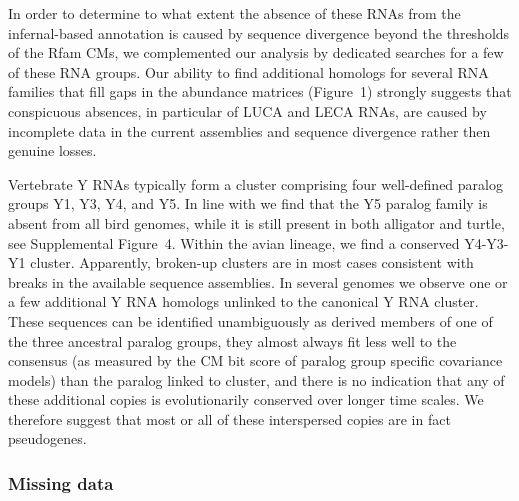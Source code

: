 \documentclass[10pt]{bmc_article}
\newenvironment{bmcformat}{\begin{raggedright}\baselineskip20pt\sloppy\setboolean{publ}{false}}{\end{raggedright}\baselineskip20pt\sloppy}
\begin{document}
\begin{bmcformat}
In order to determine to what extent the absence of these RNAs from
the infernal-based annotation is caused by sequence divergence beyond
the thresholds of the Rfam CMs, we complemented our analysis by
dedicated searches for a few of these RNA groups. Our ability to find
additional homologs for several RNA families that fill gaps in the
abundance matrices (Figure~1) strongly suggests that conspicuous
absences, in particular of LUCA and LECA RNAs, are caused by
incomplete data in the current assemblies and sequence divergence
rather then genuine losses.

Vertebrate Y RNAs typically form a cluster comprising four
well-defined paralog groups Y1, Y3, Y4, and Y5. In line with
\cite{Mosig:07a} we find that the Y5 paralog family is absent from all
bird genomes, while it is still present in both alligator and turtle,
see Supplemental Figure~4. Within the avian lineage, we find a
conserved Y4-Y3-Y1 cluster. Apparently, broken-up clusters are in most
cases consistent with breaks in the available sequence assemblies.  In
several genomes we observe one or a few additional Y RNA homologs
unlinked to the canonical Y RNA cluster. These sequences can be
identified unambiguously as derived members of one of the three
ancestral paralog groups, they almost always fit less well to the
consensus (as measured by the CM bit score of paralog group specific
covariance models) than the paralog linked to cluster, and there is no
indication that any of these additional copies is evolutionarily
conserved over longer time scales. We therefore suggest that most or
all of these interspersed copies are in fact pseudogenes.

\subsubsection*{Missing data}


\end{bmcformat}
\end{document}
